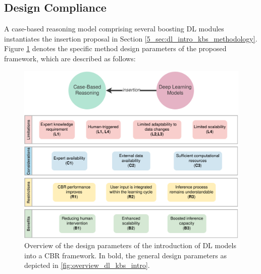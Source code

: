 \subsection{Design Compliance}\label{5_sec:design_compliance}
A case-based reasoning model comprising several boosting DL modules instantiates the insertion proposal in Section \ref{5_sec:dl_intro_kbs_methodology}. Figure \ref{fig:compliance_dl_into_kbs} denotes the specific method design parameters of the proposed framework, which are described as follows:

\begin{figure}[t]
    \centering
    \includegraphics[width=\linewidth]{5_dlintegrationkbs/figures/Instance_DL_intro_KBS.eps}
    \caption{Overview of the design parameters of the introduction of DL models into a CBR framework. In bold, the general design parameters as depicted in \ref{fig:overview_dl_kbs_intro}.}
    \label{fig:compliance_dl_into_kbs}
\end{figure}

